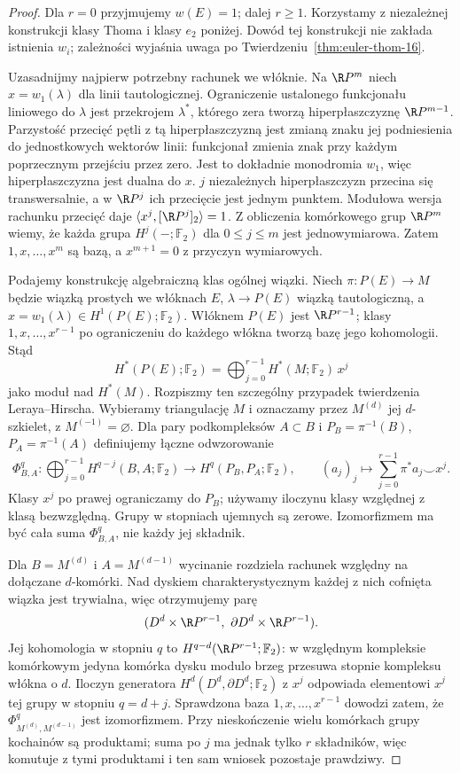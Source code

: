 \begin{proof}
Dla $r=0$ przyjmujemy $w(E)=1$; dalej $r\geq1$.
Korzystamy z niezależnej konstrukcji klasy Thoma
i klasy $e_2$ poniżej. Dowód tej konstrukcji nie
zakłada istnienia $w_i$; zależności wyjaśnia uwaga
po Twierdzeniu~\ref{thm:euler-thom-16}.

Uzasadnijmy najpierw potrzebny rachunek we włóknie.
Na $\R P^m$ niech $x=w_1(\lambda)$ dla linii
tautologicznej. Ograniczenie ustalonego funkcjonału
liniowego do $\lambda$ jest przekrojem $\lambda^*$,
którego zera tworzą hiperpłaszczyznę $\R P^{m-1}$.
Parzystość przecięć pętli z tą hiperpłaszczyzną
jest zmianą znaku jej podniesienia do jednostkowych
wektorów linii: funkcjonał zmienia znak przy każdym
poprzecznym przejściu przez zero. Jest to dokładnie
monodromia $w_1$, więc hiperpłaszczyzna jest dualna do $x$.
$j$ niezależnych hiperpłaszczyzn przecina się
transwersalnie, a w $\R P^j$ ich przecięcie jest
jednym punktem. Modułowa wersja rachunku przecięć daje
$\langle x^j,[\R P^j]_2\rangle=1$.
Z obliczenia komórkowego grup $\R P^m$ wiemy, że
każda grupa $H^j(-;\mathbb F_2)$ dla $0\leq j\leq m$
jest jednowymiarowa. Zatem $1,x,\ldots,x^m$ są bazą,
a $x^{m+1}=0$ z przyczyn wymiarowych.

Podajemy konstrukcję algebraiczną klas ogólnej wiązki.
Niech $\pi:P(E)\to M$ będzie wiązką
prostych we włóknach $E$,
$\lambda\to P(E)$ wiązką
tautologiczną, a
$x=w_1(\lambda)\in
H^1(P(E);\mathbb F_2)$.
Włóknem $P(E)$ jest
$\R P^{r-1}$; klasy
$1,x,\ldots,x^{r-1}$
po ograniczeniu do
każdego włókna tworzą
bazę jego kohomologii.
Stąd
\[
 H^*(P(E);\mathbb F_2)
  =\bigoplus_{j=0}^{r-1}
     H^*(M;\mathbb F_2)\,x^j
\]
jako moduł nad $H^*(M)$.
Rozpiszmy ten szczególny przypadek twierdzenia Leraya--Hirscha.
Wybieramy triangulację $M$ i oznaczamy przez $M^{(d)}$ jej
$d$-szkielet, z $M^{(-1)}=\varnothing$. Dla pary podkompleksów
$A\subset B$ i $P_B=\pi^{-1}(B)$, $P_A=\pi^{-1}(A)$ definiujemy
łączne odwzorowanie
\[
 \Phi^q_{B,A}:\bigoplus_{j=0}^{r-1}H^{q-j}(B,A;\mathbb F_2)
 \longrightarrow H^q(P_B,P_A;\mathbb F_2),
 \qquad (a_j)_j\longmapsto\sum_{j=0}^{r-1}\pi^*a_j\smile x^j.
\]
Klasy $x^j$ po prawej ograniczamy do $P_B$; używamy iloczynu
klasy względnej z klasą bezwzględną. Grupy w stopniach ujemnych są zerowe.
Izomorfizmem ma być cała suma $\Phi^q_{B,A}$, nie każdy jej składnik.

Dla $B=M^{(d)}$ i $A=M^{(d-1)}$ wycinanie rozdziela rachunek względny
na dołączane $d$-komórki. Nad dyskiem charakterystycznym każdej
z nich cofnięta wiązka jest trywialna, więc otrzymujemy parę
\[
 (D^d\times\R P^{r-1},\ \partial D^d\times\R P^{r-1}).
\]
Jej kohomologia w stopniu $q$ to $H^{q-d}(\R P^{r-1};\mathbb F_2)$:
w względnym kompleksie komórkowym jedyna komórka dysku modulo
brzeg przesuwa stopnie kompleksu włókna o $d$.
Iloczyn generatora $H^d(D^d,\partial D^d;\mathbb F_2)$ z $x^j$
odpowiada elementowi $x^j$ tej grupy w stopniu $q=d+j$.
Sprawdzona baza $1,x,\ldots,x^{r-1}$ dowodzi zatem, że
$\Phi^q_{M^{(d)},M^{(d-1)}}$ jest izomorfizmem.
Przy nieskończenie wielu komórkach grupy kochainów są produktami;
suma po $j$ ma jednak tylko $r$ składników, więc komutuje z tymi
produktami i ten sam wniosek pozostaje prawdziwy.


\end{proof}
